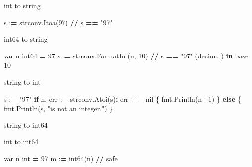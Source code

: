 \documentclass[]{book}
\newenvironment{Shaded}{\begin{snugshade}}{\end{snugshade}}
\newcommand{\KeywordTok}[1]{\textcolor[rgb]{0.13,0.29,0.53}{\textbf{#1}}}
\newcommand{\DecValTok}[1]{\textcolor[rgb]{0.00,0.00,0.81}{#1}}
\newcommand{\SpecialCharTok}[1]{\textcolor[rgb]{0.00,0.00,0.00}{#1}}
\newcommand{\StringTok}[1]{\textcolor[rgb]{0.31,0.60,0.02}{#1}}
\newcommand{\ControlFlowTok}[1]{\textcolor[rgb]{0.13,0.29,0.53}{\textbf{#1}}}
\newcommand{\OperatorTok}[1]{\textcolor[rgb]{0.81,0.36,0.00}{\textbf{#1}}}
\newcommand{\BuiltInTok}[1]{#1}
\newcommand{\NormalTok}[1]{#1}
\begin{document}
int to string

\begin{Shaded}
\begin{Highlighting}[]
\NormalTok{s :}\OperatorTok{=}\NormalTok{ strconv.Itoa(}\DecValTok{97}\NormalTok{) }\OperatorTok{//}\NormalTok{ s }\OperatorTok{==} \StringTok{"97"}
\end{Highlighting}
\end{Shaded}

int64 to string

\begin{Shaded}
\begin{Highlighting}[]
\NormalTok{var n int64 }\OperatorTok{=} \DecValTok{97}
\NormalTok{s :}\OperatorTok{=}\NormalTok{ strconv.FormatInt(n, }\DecValTok{10}\NormalTok{) }\OperatorTok{//}\NormalTok{ s }\OperatorTok{==} \StringTok{"97"}\NormalTok{ (decimal) }\KeywordTok{in}\NormalTok{ base }\DecValTok{10}
\end{Highlighting}
\end{Shaded}

string to int

\begin{Shaded}
\begin{Highlighting}[]
\NormalTok{s :}\OperatorTok{=} \StringTok{"97"}
\ControlFlowTok{if}\NormalTok{ n, err :}\OperatorTok{=}\NormalTok{ strconv.Atoi(s)}\OperatorTok{;}\NormalTok{ err }\OperatorTok{==}\NormalTok{ nil \{}
\NormalTok{    fmt.Println(n}\OperatorTok{+}\DecValTok{1}\NormalTok{)}
\NormalTok{\} }\ControlFlowTok{else}\NormalTok{ \{}
\NormalTok{    fmt.Println(s, }\StringTok{"is not an integer."}\NormalTok{)}
\NormalTok{\}}
\end{Highlighting}
\end{Shaded}

string to int64

\begin{Shaded}
\end{Shaded}

int to int64

\begin{Shaded}
\begin{Highlighting}[]
\NormalTok{var n }\BuiltInTok{int} \OperatorTok{=} \DecValTok{97}
\NormalTok{m :}\OperatorTok{=}\NormalTok{ int64(n) }\OperatorTok{//}\NormalTok{ safe}
\end{Highlighting}
\end{Shaded}
\end{document}
